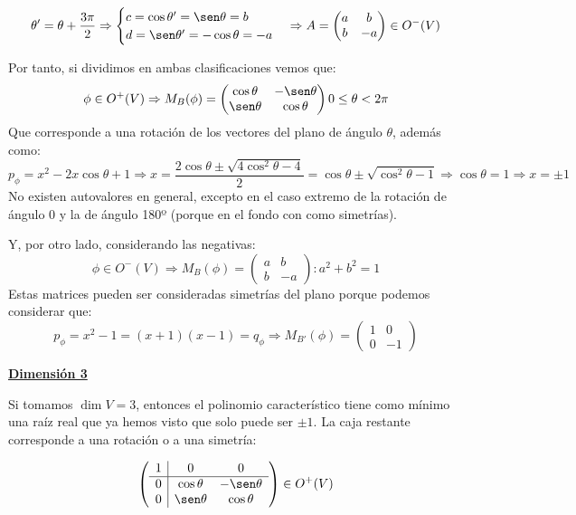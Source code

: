 \documentclass[10pt,a4paper,openright]{book}
\theoremstyle{break}
\begin{document}
$$\theta' = \theta +\frac{3\pi}{2} \Rightarrow \begin{cases} c = \cos \theta' = \sen \theta = b \\ d = \sen \theta' = -\cos\theta = -a \end{cases} \Rightarrow A = \begin{pmatrix} a & b \\ b & -a\end{pmatrix}\in O^-(V)$$

Por tanto, si dividimos en ambas clasificaciones vemos que:
$$\phi\in O^+(V)\Rightarrow M_B(\phi)  = \begin{pmatrix} \cos \theta & -\sen \theta  \\ \sen \theta & \cos \theta \end{pmatrix} 0 \leq \theta < 2\pi$$
Que corresponde a una rotación de los vectores del plano de ángulo $\theta$, además como:
$$p_\phi = x^2-2x\cos \theta + 1\Rightarrow x = \frac{2\cos\theta \pm \sqrt{4\cos^2\theta - 4}}{2} = \cos\theta \pm \sqrt{\cos^2\theta - 1}\Rightarrow \cos\theta = 1\Rightarrow x = \pm 1$$
No existen autovalores en general, excepto en el caso extremo de la rotación de ángulo 0 y la de ángulo 180º (porque en el fondo con como simetrías).

Y, por otro lado, considerando las negativas:
$$ \phi  \in O^-(V)\Rightarrow M_B(\phi) = \begin{pmatrix} a & b  \\ b & -a  \end{pmatrix}: a^2 + b^2 = 1$$
Estas matrices pueden ser consideradas simetrías del plano porque podemos considerar que:
$$p_\phi = x^2 - 1 = (x+1)(x-1) = q_\phi\Rightarrow M_{B'}(\phi) = \begin{pmatrix} 1 & 0  \\ 0 & -1  \end{pmatrix}$$

\underline{\textbf{Dimensión 3}}

Si tomamos $\dim V = 3$, entonces el polinomio característico tiene como mínimo una raíz real que ya hemos visto que solo puede ser $\pm 1$. La caja restante corresponde a una rotación o a una simetría:

$$\left(\begin{array}{c|cc}
1  & 0 & 0 \\
\hline
0  & \cos\theta & -\sen\theta \\
0 & \sen\theta & \cos\theta
\end{array}
\right) \in O^+ (V)$$
\end{document}
